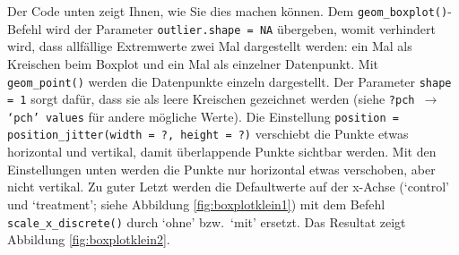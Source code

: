 \documentclass[oneside, 10pt]{book}\usepackage[]{graphicx}\usepackage[]{xcolor}
\begin{document}
Der Code unten zeigt Ihnen, wie Sie dies machen können.
Dem \texttt{geom\_boxplot()}-Befehl wird der Parameter
\texttt{outlier.shape = NA} übergeben, womit verhindert wird,
dass allfällige Extremwerte zwei Mal dargestellt werden: ein Mal
als Kreischen beim Boxplot und ein Mal als einzelner Datenpunkt.
Mit \texttt{geom\_point()} werden die Datenpunkte einzeln dargestellt.
Der Parameter \texttt{shape = 1} sorgt dafür, dass sie als leere Kreischen
gezeichnet werden
(siehe \texttt{?pch $\rightarrow$ `pch' values} für andere mögliche Werte).
Die Einstellung \texttt{position = position\_jitter(width = ?, height = ?)}
verschiebt die Punkte etwas horizontal und vertikal, damit überlappende
Punkte sichtbar werden. Mit den Einstellungen unten werden die Punkte
nur horizontal etwas verschoben, aber nicht vertikal.
Zu guter Letzt werden die Defaultwerte auf der x-Achse (`control' und `treatment'; siehe Abbildung \ref{fig:boxplotklein1}) mit
dem Befehl \texttt{scale\_x\_discrete()} durch `ohne' bzw.\ `mit' ersetzt.
Das Resultat zeigt Abbildung \vref{fig:boxplotklein2}.
\end{document}
